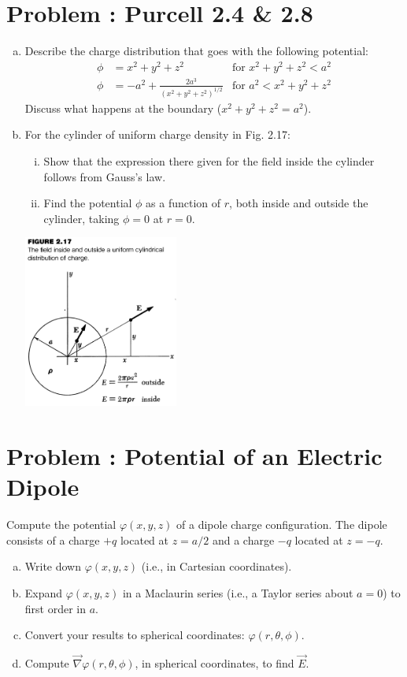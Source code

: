 \documentclass[problems]{esg8022pset}
\begin{document}
\section{Problem \thesection: Purcell 2.4 \& 2.8}
  \begin{enumerate}[(a)]
    \item Describe the charge distribution that goes with the following potential:
      \begin{align*}
        \phi & = x^2 + y^2 + z^2 & \text{for }x^2 + y^2 + z^2 < a^2 \\
        \phi & = -a^2 + \frac{2a^3}{(x^2 + y^2 + z^2)^{1/2}} & \text{for }a^2 < x^2 + y^2 + z^2
      \end{align*}
      Discuss what happens at the boundary ($x^2 + y^2 + z^2 = a^2$).
    \item For the cylinder of uniform charge density in Fig. 2.17:
      \begin{enumerate}[(i)]
        \item Show that the expression there given for the field inside the cylinder follows from Gauss's law.
        \item Find the potential $\phi$ as a function of $r$, both inside and outside the cylinder, taking $\phi = 0$ at $r = 0$.
      \end{enumerate}
      \begin{center}\includegraphics[width=0.4\textwidth]{ps02_2}\end{center}
  \end{enumerate}
\section{Problem \thesection: Potential of an Electric Dipole}
  Compute the potential $\varphi(x,y,z)$ of a dipole charge configuration.  The dipole consists of a charge $+q$ located at $z = a/2$ and a charge $-q$ located at $z=-q$.
  \begin{enumerate}[(a)]
    \item Write down $\varphi(x,y,z)$ (i.e., in Cartesian coordinates).
    \item Expand $\varphi(x,y,z)$ in a Maclaurin series (i.e., a Taylor series about $a=0$) to first order in $a$.
    \item Convert your results to spherical coordinates: $\varphi(r, \theta, \phi)$.
    \item Compute $\vec{\nabla}\varphi(r, \theta, \phi)$, in spherical coordinates, to find $\vec{E}$.%
  \end{enumerate}
\end{document}
